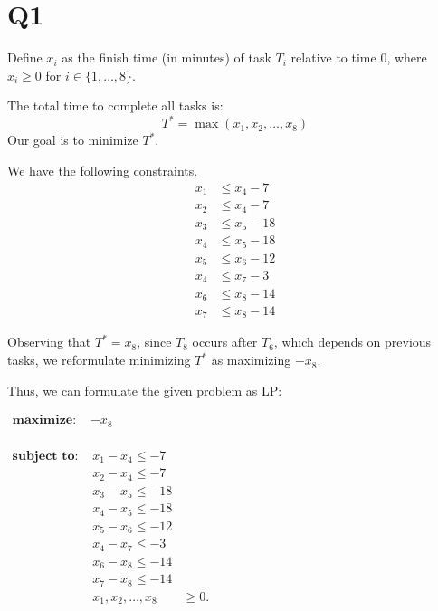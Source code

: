 \section*{Q1}

Define \( x_i \) as the finish time (in minutes) of task \( T_i \) relative to time 0, where \( x_i \geq 0 \) for \( i \in \{1, \dots, 8\} \).  

The total time to complete all tasks is:
\[
T^* = \max(x_1, x_2, \dots, x_8)
\]
Our goal is to minimize \( T^* \).  

We have the following constraints.
\begin{align*}
x_1 &\leq x_4 - 7 \\
x_2 &\leq x_4 - 7 \\
x_3 &\leq x_5 - 18 \\
x_4 &\leq x_5 - 18 \\
x_5 &\leq x_6 - 12 \\
x_4 &\leq x_7 - 3 \\
x_6 &\leq x_8 - 14 \\
x_7 &\leq x_8 - 14
\end{align*}

Observing that \( T^* = x_8 \), since \( T_8 \) occurs after \( T_6 \), which depends on previous tasks, we reformulate minimizing \( T^* \) as maximizing \( -x_8 \).

Thus, we can formulate the given problem as LP:

$
\begin{aligned}
    \textbf{maximize: } & -x_8 \\
\end{aligned}
$

$
\begin{aligned}
    \textbf{subject to: }
    & x_1 - x_4 \leq -7 \\
    & x_2 - x_4 \leq -7 \\
    & x_3 - x_5 \leq -18 \\
    & x_4 - x_5 \leq -18 \\
    & x_5 - x_6 \leq -12 \\
    & x_4 - x_7 \leq -3 \\
    & x_6 - x_8 \leq -14 \\
    & x_7 - x_8 \leq -14 \\
    & x_1, x_2, \dots, x_8 &\geq 0.
\end{aligned}
$
